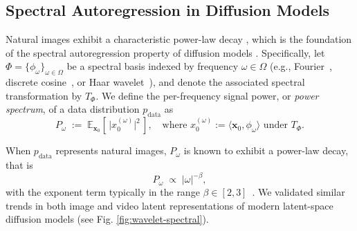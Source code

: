 



\subsection{Spectral Autoregression in Diffusion Models}
\label{sec:method:prelim:spectral}

Natural images exhibit a characteristic power-law decay \citep{ruderman1997origins}, which is the foundation of the spectral autoregression property of diffusion models \citep{dieleman2024spectral}. Specifically, let $\Phi = \{\phi_\omega\}_{\omega \in \Omega}$ be a spectral basis indexed by frequency $\omega \in \Omega$ (e.g., Fourier~\citep{fourier1822theorie}, discrete cosine~\citep{ahmed1974dct}, or Haar wavelet~\citep{haar1909theorie}), and denote the associated spectral transformation by $T_\Phi$. We define the per-frequency signal power, or \emph{power spectrum}, of a data distribution $p_{\text{data}}$ as
\begin{equation}
  P_\omega \;:=\; \mathbb{E}_{\mathbf{x}_0}\!\left[\,\bigl|x_0^{(\omega)}\bigr|^2\,\right],
  \quad \text{where  } x_0^{(\omega)} := \langle \mathbf{x}_0, \phi_\omega \rangle \text{ under $T_\Phi$}.
  \label{eq:Pb-def}
\end{equation}

When $p_\text{data}$ represents natural images, $P_\omega$ is known to exhibit a power-law decay, that is
\begin{equation}
  P_\omega \;\propto\; |\omega|^{-\beta},
  \label{eq:power-law}
\end{equation}
with the exponent term typically in the range $\beta \in [2, 3]$~\citep{dieleman2024spectral,fourierspace}. We validated similar trends in both image and video latent representations of modern latent-space diffusion models (see Fig. \ref{fig:wavelet-spectral}).



